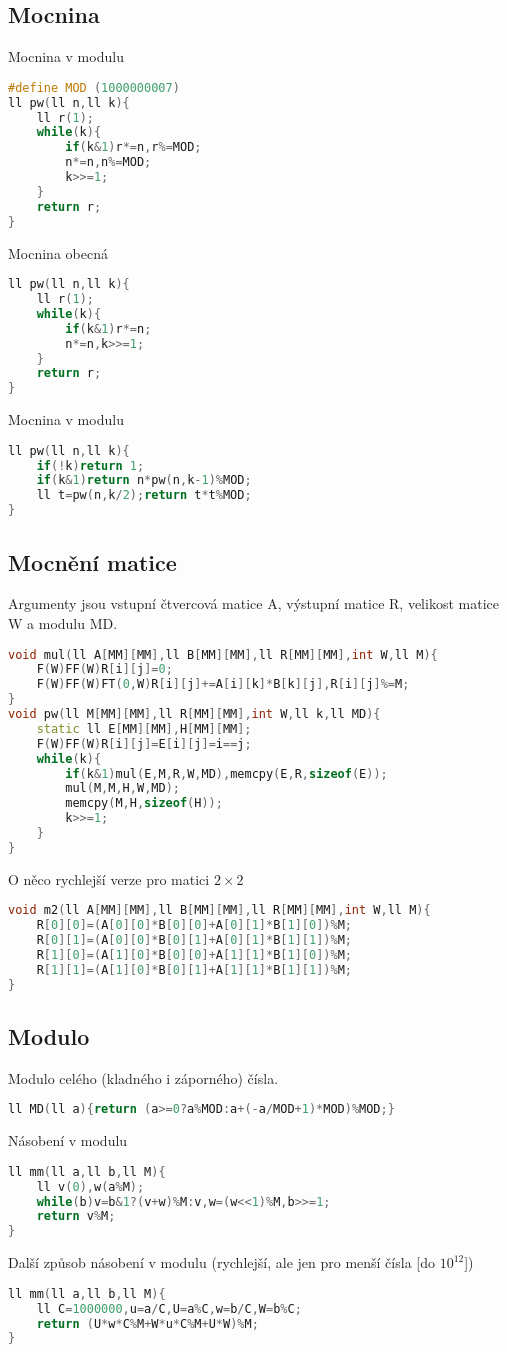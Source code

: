 \documentclass[11pt]{article}
\begin{document}
\subsection{Mocnina}
Mocnina v modulu
\begin{lstlisting}[language=C++]
#define MOD (1000000007)
ll pw(ll n,ll k){
    ll r(1);
    while(k){
        if(k&1)r*=n,r%=MOD;
        n*=n,n%=MOD;
        k>>=1;
    }
    return r;
}
\end{lstlisting}
Mocnina obecná
\begin{lstlisting}[language=C++]
ll pw(ll n,ll k){
    ll r(1);
    while(k){
        if(k&1)r*=n;
        n*=n,k>>=1;
    }
    return r;
}
\end{lstlisting}
Mocnina v modulu
\begin{lstlisting}[language=C++]
ll pw(ll n,ll k){
    if(!k)return 1;
    if(k&1)return n*pw(n,k-1)%MOD;
    ll t=pw(n,k/2);return t*t%MOD;
}
\end{lstlisting}
\subsection{Mocnění matice}
Argumenty jsou vstupní čtvercová matice \textsf{A}, výstupní matice \textsf{R}, velikost matice \textsf{W} a modulu \textsf{MD}.
\begin{lstlisting}[language=C++]
void mul(ll A[MM][MM],ll B[MM][MM],ll R[MM][MM],int W,ll M){
    F(W)FF(W)R[i][j]=0;
    F(W)FF(W)FT(0,W)R[i][j]+=A[i][k]*B[k][j],R[i][j]%=M;
}
void pw(ll M[MM][MM],ll R[MM][MM],int W,ll k,ll MD){
    static ll E[MM][MM],H[MM][MM];
    F(W)FF(W)R[i][j]=E[i][j]=i==j;
    while(k){
        if(k&1)mul(E,M,R,W,MD),memcpy(E,R,sizeof(E));
        mul(M,M,H,W,MD);
        memcpy(M,H,sizeof(H));
        k>>=1;
    }
}
\end{lstlisting}
O něco rychlejší verze pro matici $2\times2$
\begin{lstlisting}[language=C++]
void m2(ll A[MM][MM],ll B[MM][MM],ll R[MM][MM],int W,ll M){
    R[0][0]=(A[0][0]*B[0][0]+A[0][1]*B[1][0])%M;
    R[0][1]=(A[0][0]*B[0][1]+A[0][1]*B[1][1])%M;
    R[1][0]=(A[1][0]*B[0][0]+A[1][1]*B[1][0])%M;
    R[1][1]=(A[1][0]*B[0][1]+A[1][1]*B[1][1])%M;
}
\end{lstlisting}
\subsection{Modulo}
Modulo celého (kladného i záporného) čísla.
\begin{lstlisting}[language=C++]
ll MD(ll a){return (a>=0?a%MOD:a+(-a/MOD+1)*MOD)%MOD;}
\end{lstlisting}
Násobení v modulu
\begin{lstlisting}[language=C++]
ll mm(ll a,ll b,ll M){
    ll v(0),w(a%M);
    while(b)v=b&1?(v+w)%M:v,w=(w<<1)%M,b>>=1;
    return v%M;
}
\end{lstlisting}
Další způsob násobení v modulu (rychlejší, ale jen pro menší čísla [do $10^{12}$])
\begin{lstlisting}[language=C++]
ll mm(ll a,ll b,ll M){
	ll C=1000000,u=a/C,U=a%C,w=b/C,W=b%C;
    return (U*w*C%M+W*u*C%M+U*W)%M;
}
\end{lstlisting}
\end{document}
